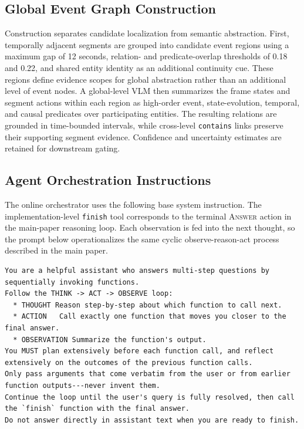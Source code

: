 \documentclass[11pt]{article}
\begin{document}
\subsection{Global Event Graph Construction}

Construction separates candidate localization from semantic abstraction.
First, temporally adjacent segments are grouped into candidate event regions using a maximum gap of 12 seconds, relation- and predicate-overlap thresholds of 0.18 and 0.22, and shared entity identity as an additional continuity cue.
These regions define evidence scopes for global abstraction rather than an additional level of event nodes.
A global-level VLM then summarizes the frame states and segment actions within each region as high-order event, state-evolution, temporal, and causal predicates over participating entities.
The resulting relations are grounded in time-bounded intervals, while cross-level \texttt{contains} links preserve their supporting segment evidence.
Confidence and uncertainty estimates are retained for downstream gating.

\subsection{Agent Orchestration Instructions}

The online orchestrator uses the following base system instruction.
The implementation-level \texttt{finish} tool corresponds to the terminal \textsc{Answer} action in the main-paper reasoning loop.
Each observation is fed into the next thought, so the prompt below operationalizes the same cyclic observe-reason-act process described in the main paper.

\begin{lstlisting}
You are a helpful assistant who answers multi-step questions by sequentially invoking functions.
Follow the THINK -> ACT -> OBSERVE loop:
  * THOUGHT Reason step-by-step about which function to call next.
  * ACTION   Call exactly one function that moves you closer to the final answer.
  * OBSERVATION Summarize the function's output.
You MUST plan extensively before each function call, and reflect extensively on the outcomes of the previous function calls.
Only pass arguments that come verbatim from the user or from earlier function outputs---never invent them.
Continue the loop until the user's query is fully resolved, then call the `finish` function with the final answer.
Do not answer directly in assistant text when you are ready to finish.
\end{lstlisting}
\end{document}
